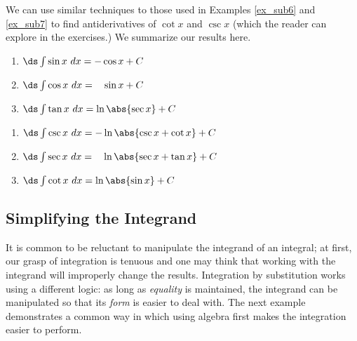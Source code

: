 We can use similar techniques to those used in Examples \ref{ex_sub6} and \ref{ex_sub7} to find antiderivatives of $\cot x$ and $\csc x$ (which the reader can explore in the exercises.) We summarize our results here.

{
\begin{theorem}\label{thm:triganti}
\begin{minipage}{.45\linewidth}\small
	\begin{enumerate}
	\item	$\ds \int \sin x \ dx = -\cos x +C$
	\item	$\ds\int \cos x\ dx = \phantom{-}\sin x + C$
	\item	$\ds \int \tan x\ dx = \ln\abs{\sec x}+C$
\end{enumerate}
\end{minipage}%
\begin{minipage}{.55\linewidth}\small
	\begin{enumerate}\addtocounter{enumi}{3}
	\item	$\ds \int \csc x \ dx = -\ln\abs{\csc x+\cot x} +C$
	\item	$\ds\int \sec x\ dx = \phantom{-}\ln\abs{\sec x+\tan x} + C$
	\item	$\ds \int \cot x\ dx = \ln\abs{\sin x}+C$
\end{enumerate}
\end{minipage}
\end{theorem}
}


\subsection{Simplifying the Integrand}

It is common to be reluctant to manipulate the integrand of an integral; at first, our grasp of integration is tenuous and one may think that working with the integrand will improperly change the results. Integration by substitution works using a different logic: as long as \textit{equality} is maintained, the integrand can be manipulated so that its \textit{form} is easier to deal with. The next example demonstrates a common way in which using algebra first makes the integration easier to perform.

